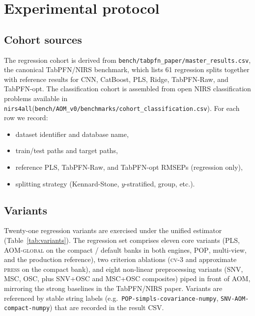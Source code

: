\documentclass[review,a4paper]{elsarticle}
\newcommand{\AOM}{\textsc{AOM}\xspace}
\newcommand{\POP}{\textsc{POP}\xspace}
\newcommand{\PLS}{\textsc{PLS}\xspace}
\newcommand{\SNV}{\textsc{SNV}\xspace}
\newcommand{\MSC}{\textsc{MSC}\xspace}
\newcommand{\OSC}{\textsc{OSC}\xspace}
\newcommand{\nirsfourall}{\texttt{nirs4all}\xspace}
\begin{document}
\section{Experimental protocol}\label{sec:protocol}

\subsection{Cohort sources}
The regression cohort is derived from
\verb|bench/tabpfn_paper/master_results.csv|, the canonical TabPFN/NIRS
benchmark, which lists 61 regression splits together with reference
results for CNN, CatBoost, \PLS, Ridge, TabPFN-Raw, and TabPFN-opt. The
classification cohort is assembled from open NIRS classification
problems available in \nirsfourall (\verb|bench/AOM_v0/benchmarks/cohort_classification.csv|).
For each row we record:
\begin{itemize}[leftmargin=2em]
  \item dataset identifier and database name,
  \item train/test paths and target paths,
  \item reference \PLS, TabPFN-Raw, and TabPFN-opt RMSEPs (regression only),
  \item splitting strategy (Kennard-Stone, $y$-stratified, group, etc.).
\end{itemize}

\subsection{Variants}
Twenty-one regression variants are exercised under the unified estimator
(Table~\ref{tab:variants}). The
regression set comprises eleven core variants (\PLS, \AOM-\textsc{global}
on the compact / default banks in both engines, \POP, multi-view, and
the production reference), two criterion ablations (\textsc{cv-3} and
approximate \textsc{press} on the compact bank), and eight non-linear
preprocessing variants (\SNV, \MSC, \OSC, plus \SNV+\OSC and \MSC+\OSC
composites) piped in front of \AOM, mirroring the strong baselines in
the TabPFN/NIRS paper.
Variants are referenced by stable string labels (e.g.\
\verb|POP-simpls-covariance-numpy|, \verb|SNV-AOM-compact-numpy|) that
are recorded in the result CSV.

\begin{table}[t]
\centering
\caption{Regression variants evaluated in the 57-split comparison.}
\label{tab:variants}
\resizebox{\linewidth}{!}{}
\end{table}
\end{document}
